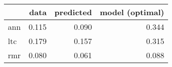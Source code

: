 \begin{tabular}{lrrr}
\toprule
{} &   data &  predicted &  model (optimal) \\
\midrule
ann &  0.115 &      0.090 &            0.344 \\
ltc &  0.179 &      0.157 &            0.315 \\
rmr &  0.080 &      0.061 &            0.088 \\
\bottomrule
\end{tabular}
